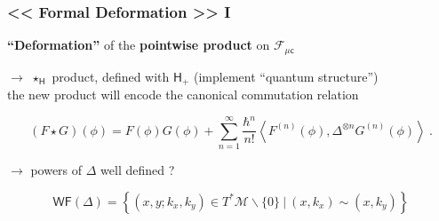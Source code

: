 \documentclass[9pt]{beamer}
\newcommand{\sm}[1]{\left\langle #1 \right\rangle}
\newcommand{\Fcal}{\mathcal{F}}
\newcommand{\Hsf}{\mathsf{H}}
\newcommand{\csf}{\mathsf{c}}
\begin{document}
\begin{frame}

\frametitle{<< Formal Deformation >> I}

\textbf{``Deformation''} of the \textbf{pointwise product} on $\Fcal_{\mu\csf}$

\vfill

$\to$ $\star_\Hsf$ product, defined with $\Hsf_+$ (implement ``quantum structure'') \\[2pt]

the new product will encode the canonical commutation relation

\vfill

\begin{block}{\vspace*{-3ex}}
\begin{equation*}
 (F \star G)(\phi) = F(\phi) G(\phi) + \sum_{n=1}^\infty \frac{\hbar^n}{n!} \sm{F^{(n)}(\phi), \Delta^{\otimes n} G^{(n)}(\phi)} \ .
\end{equation*}
\end{block}

\vfill

$\to$ powers of $\Delta$ well defined ? 

\vfill

\begin{equation*}
\mathsf{WF}(\Delta) = \left\{ (x,y;k_x,k_y) \in T^\ast \mathcal{M} \backslash \{0\} \ | \ (x,k_x) \sim (x,k_y) \right\} 
\end{equation*}

\vfill

\end{frame}  

\end{document}
